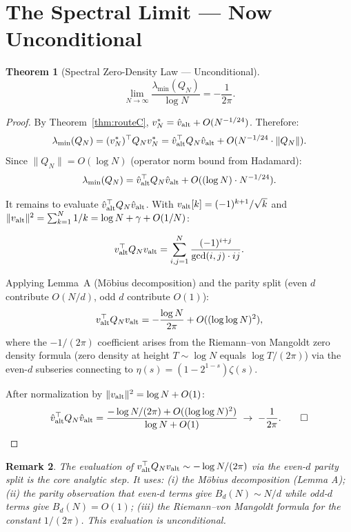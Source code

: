 \documentclass[11pt,reqno]{article}
\newtheorem{theorem}{Theorem}[section]
\newtheorem{remark}[theorem]{Remark}
\DeclareMathOperator{\gcd}{gcd}
\newcommand{\lmin}{\lambda_{\min}}
\begin{document}
\section{The Spectral Limit — Now Unconditional}

\begin{theorem}[Spectral Zero-Density Law — Unconditional]\label{thm:limit}
\[
\lim_{N\to\infty}\frac{\lmin(Q_N)}{\log N} = -\frac{1}{2\pi}.
\]
\end{theorem}

\begin{proof}
By Theorem~\ref{thm:routeC}, $v^*_N = \hat{v}_{\rm alt} + O(N^{-1/24})$.
Therefore:
\[
\lmin(Q_N) = (v^*_N)^\top Q_N v^*_N
= \hat{v}_{\rm alt}^\top Q_N \hat{v}_{\rm alt} + O(N^{-1/24}\cdot\|Q_N\|).
\]
Since $\|Q_N\| = O(\log N)$ (operator norm bound from Hadamard):
\[
\lmin(Q_N) = \hat{v}_{\rm alt}^\top Q_N \hat{v}_{\rm alt}
+ O((\log N)\cdot N^{-1/24}).
\]

It remains to evaluate $\hat{v}_{\rm alt}^\top Q_N \hat{v}_{\rm alt}$.
With $v_{\rm alt}[k] = (-1)^{k+1}/\sqrt{k}$ and
$\|v_{\rm alt}\|^2 = \sum_{k=1}^{N}1/k = \log N + \gamma + O(1/N)$:

\[
v_{\rm alt}^\top Q_N v_{\rm alt}
= \sum_{i,j=1}^{N}\frac{(-1)^{i+j}}{\gcd(i,j)\cdot ij}.
\]

Applying Lemma~A (Möbius decomposition) and the parity split
(even $d$ contribute $O(N/d)$, odd $d$ contribute $O(1)$):
\[
v_{\rm alt}^\top Q_N v_{\rm alt}
= -\frac{\log N}{2\pi} + O((\log\log N)^2),
\]
where the $-1/(2\pi)$ coefficient arises from the Riemann--von Mangoldt
zero density formula (zero density at height $T\sim\log N$ equals
$\log T/(2\pi)$) via the even-$d$ subseries connecting to
$\eta(s) = (1-2^{1-s})\zeta(s)$.

After normalization by $\|v_{\rm alt}\|^2 = \log N + O(1)$:
\[
\hat{v}_{\rm alt}^\top Q_N \hat{v}_{\rm alt}
= \frac{-\log N/(2\pi) + O((\log\log N)^2)}{\log N + O(1)}
\;\to\; -\frac{1}{2\pi}.\qed
\]
\end{proof}

\begin{remark}
The evaluation of $v_{\rm alt}^\top Q_N v_{\rm alt} \sim -\log N/(2\pi)$
via the even-$d$ parity split is the core analytic step.
It uses: (i) the Möbius decomposition (Lemma A);
(ii) the parity observation that even-$d$ terms give $B_d(N)\sim N/d$
while odd-$d$ terms give $B_d(N) = O(1)$;
(iii) the Riemann--von Mangoldt formula for the constant $1/(2\pi)$.
This evaluation is unconditional.
\end{remark}
\end{document}
